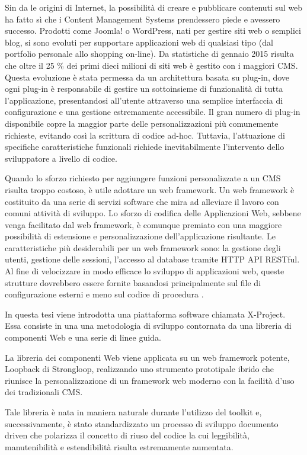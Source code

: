 Sin da le origini di Internet, la possibilità di creare e pubblicare contenuti sul web ha fatto sì che i Content Management Systems prendessero piede e avessero successo. Prodotti come Joomla! o WordPress, nati per gestire siti web o semplici blog, si sono evoluti per supportare applicazioni web di qualsiasi tipo (dal portfolio personale allo shopping on-line). Da statistiche di gennaio 2015 risulta che oltre il 25 \% dei primi dieci milioni di siti web è gestito con i maggiori CMS\cite{cms_stats}. Questa evoluzione è stata permessa da un architettura basata su plug-in, dove ogni plug-in è responsabile di gestire un sottoinsieme di funzionalità di tutta l'applicazione, presentandosi all'utente attraverso una semplice interfaccia di configurazione e una gestione estremamente accessibile.
Il gran numero di plug-in disponibile copre la maggior parte delle personalizzazioni più comunemente richieste, evitando così la scrittura di codice ad-hoc. Tuttavia, l'attuazione di specifiche caratteristiche funzionali richiede inevitabilmente l'intervento dello sviluppatore a livello di codice.

Quando lo sforzo richiesto per aggiungere funzioni personalizzate a un CMS risulta troppo costoso, è utile adottare un web framework. Un web framework è costituito da una serie di servizi software che mira ad alleviare il lavoro con comuni attività di sviluppo. Lo sforzo di codifica delle Applicazioni Web, sebbene venga facilitato dal web framework, è comunque premiato con una maggiore possibilità di estensione e personalizzazione dell'applicazione risultante.
Le caratteristiche più desiderabili per un web framework sono: la gestione degli utenti, gestione delle sessioni, l'accesso al database tramite HTTP API RESTful. Al fine di velocizzare in modo efficace lo sviluppo di applicazioni web, queste strutture dovrebbero essere fornite basandosi principalmente sul file di configurazione esterni e meno sul codice di procedura \cite{MIPRO}.

In questa tesi viene introdotta una piattaforma software chiamata X-Project. Essa consiste in una una metodologia di sviluppo contornata da una libreria di componenti Web e una serie di linee guida.

La libreria dei componenti Web viene applicata su un web framework potente, Loopback di Strongloop, realizzando uno strumento prototipale ibrido che riunisce la personalizzazione di un framework web moderno con la facilità d'uso dei tradizionali CMS.

Tale libreria è nata in maniera naturale durante l'utilizzo del toolkit e, successivamente, è stato standardizzato un processo di sviluppo documento driven che polarizza il concetto di riuso del codice la cui leggibilità, manutenibilità e estendibilità risulta estremamente aumentata.

